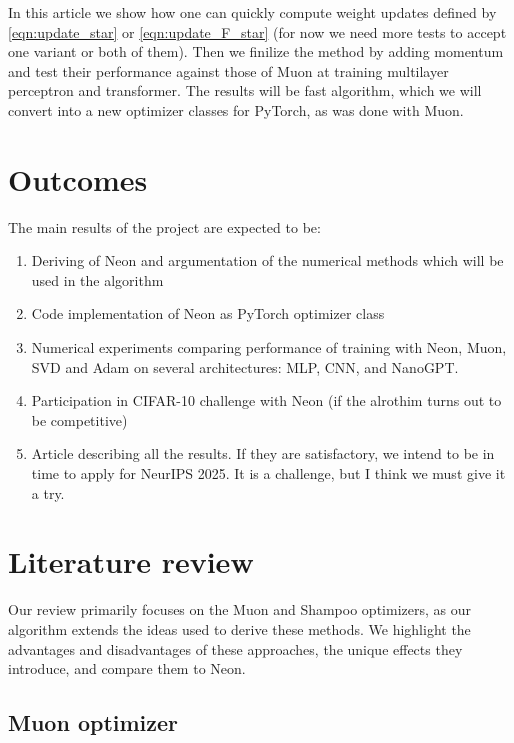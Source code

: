\documentclass[]{scrartcl}
\begin{document}
In this article we show how one can quickly compute weight updates defined by \eqref{eqn:update_star} or \eqref{eqn:update_F_star} (for now we need more tests to accept one variant or both of them). Then we finilize the method by adding momentum and test their performance against those of Muon at training multilayer perceptron and transformer. The results will be fast algorithm, which we will convert into a new optimizer classes for PyTorch, as was done with Muon.

\section{Outcomes}
The main results of the project are expected to be:
\begin{enumerate}
    \item Deriving of Neon and argumentation of the numerical methods which will be used in the algorithm
    \item Code implementation of Neon as PyTorch optimizer class
    \item Numerical experiments comparing performance of training with Neon, Muon, SVD and Adam on several architectures: MLP, CNN, and NanoGPT.
    \item Participation in CIFAR-10 challenge with Neon (if the alrothim turns out to be competitive)
    \item Article describing all the results. If they are satisfactory, we intend to be in time to apply for NeurIPS 2025. It is a challenge, but I think we must give it a try.
\end{enumerate}

\section{Literature review}
Our review primarily focuses on the Muon and Shampoo optimizers, as our algorithm extends the ideas used to derive these methods. We highlight the advantages and disadvantages of these approaches, the unique effects they introduce, and compare them to Neon.

\subsection{Muon optimizer}
\end{document}
